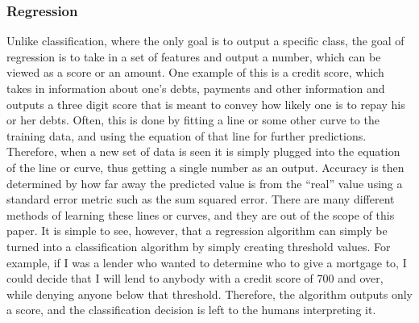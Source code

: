 \documentclass[12pt]{article} %
\begin{document}
\subsubsection{Regression}
Unlike classification, where the only goal is to output a specific class, the goal of regression is to take in a set of features and output a number, which can be viewed as a score or an amount. One example of this is a credit score, which takes in information about one's debts, payments and other information and outputs a three digit score that is meant to convey how likely one is to repay his or her debts. Often, this is done by fitting a line or some other curve to the training data, and using the equation of that line for further predictions. Therefore, when a new set of data is seen it is simply plugged into the equation of the line or curve, thus getting a single number as an output. Accuracy is then determined by how far away the predicted value is from the ``real'' value using a standard error metric such as the sum squared error. There are many different methods of learning these lines or curves, and they are out of the scope of this paper. It is simple to see, however, that a regression algorithm can simply be turned into a classification algorithm by simply creating threshold values. For example, if I was a lender who wanted to determine who to give a mortgage to, I could decide that I will lend to anybody with a credit score of 700 and over, while denying anyone below that threshold. Therefore, the algorithm outputs only a score, and the classification decision is left to the humans interpreting it. 
\end{document}
